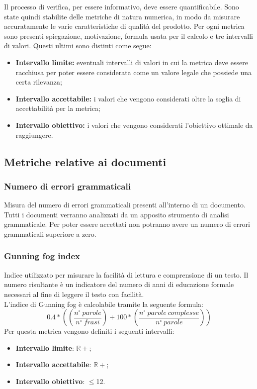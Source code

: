 Il processo di verifica, per essere informativo, deve essere quantificabile. Sono state quindi stabilite delle metriche di natura numerica, in modo da misurare accuratamente le varie caratteristiche di qualità del prodotto. Per ogni metrica sono presenti  spiegazione, motivazione, formula usata per il calcolo e tre intervalli di valori. Questi ultimi sono distinti come segue:
\begin{itemize}
	\item {\textbf{Intervallo limite:} eventuali intervalli di valori in cui la metrica deve essere racchiusa per poter essere considerata come un valore legale che possiede una certa rilevanza;}
	\item {\textbf{Intervallo accettabile:} i valori che vengono considerati oltre la soglia di accettabilità per la metrica;}
	\item {\textbf{Intervallo obiettivo:} i valori che vengono considerati l'obiettivo ottimale da raggiungere.}
\end{itemize}

\subsection{Metriche relative ai documenti}
\subsubsection{Numero di errori grammaticali}
Misura del numero di errori grammaticali presenti all'interno di un documento.
Tutti i documenti verranno analizzati da un apposito strumento di analisi grammaticale. Per poter essere accettati non potranno avere un numero di errori grammaticali superiore a zero.

\subsubsection{Gunning fog index}
Indice utilizzato per misurare la facilità di lettura e comprensione di un testo. Il numero risultante è un indicatore del numero di anni di educazione formale necessari al fine di leggere il testo con facilità. \\
L'indice di Gunning fog è calcolabile tramite la seguente formula:
$$
	0.4*((\frac{n^{\circ}\:parole}{n^{\circ}\:frasi})+100*(\frac{n^{\circ}\:parole\:complesse}{n^{\circ}\:parole}))
$$
Per questa metrica vengono definiti i seguenti intervalli: 
\begin{itemize}
	\item{\textbf{Intervallo limite}: $\mathbb{R+}$;}
	\item{\textbf{Intervallo accettabile}: $\mathbb{R+}$;}
	\item{\textbf{Intervallo obiettivo}: $\leq$12.}
\end{itemize}
